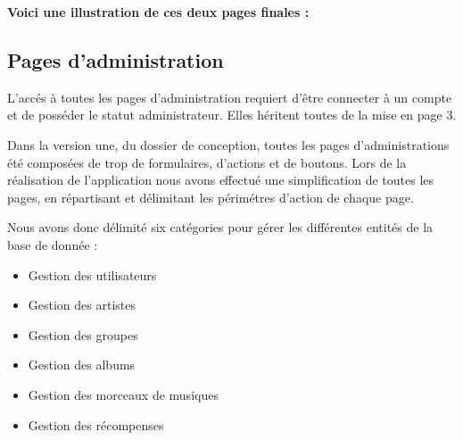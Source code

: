             \begin{paragraphe}
                \textbf{Voici une illustration de ces deux pages finales :}
            \end{paragraphe}



	\clearpage

	\subsection{Pages d'administration}

        \begin{paragraphe}
            L'accés à toutes les pages d'administration requiert d'être connecter à un compte et de posséder le statut administrateur. Elles héritent toutes de la mise en page 3.
        \end{paragraphe}
        
        \begin{paragraphe}
            Dans la version une, du dossier de conception, toutes les pages d'administrations été composées de trop de formulaires, d'actions et de boutons.
            Lors de la réalisation de l'application nous avons effectué une simplification de toutes les pages, en répartisant et délimitant les périmétres d'action de chaque page.
        \end{paragraphe}
    
        \begin{paragraphe}
            Nous avons donc délimité six catégories pour gérer les différentes entités de la base de donnée :
            \vspace{1em}
            \begin{itemize}
                \item Gestion des utilisateurs
                \item Gestion des artistes
                \item Gestion des groupes
                \item Gestion des albums
                \item Gestion des morceaux de musiques
                \item Gestion des récompenses
            \end{itemize}
        \end{paragraphe}
        
